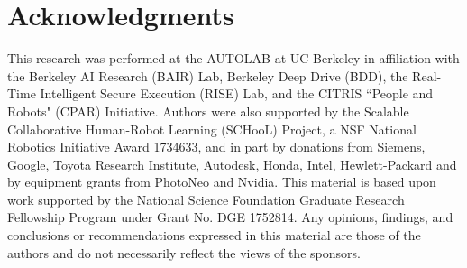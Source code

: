 \section{Acknowledgments}
\begin{scriptsize}
\noindent This research was performed at the AUTOLAB at UC Berkeley in affiliation with the Berkeley AI Research (BAIR) Lab, Berkeley Deep Drive (BDD), the Real-Time Intelligent Secure Execution (RISE) Lab, and the CITRIS ``People and Robots" (CPAR) Initiative. Authors were also supported by the Scalable Collaborative Human-Robot Learning (SCHooL) Project, a NSF National Robotics Initiative Award 1734633, and in part by donations from Siemens, Google, Toyota Research Institute, Autodesk, Honda, Intel, Hewlett-Packard and by equipment grants from PhotoNeo and Nvidia. This material is based upon work supported by the National Science Foundation Graduate Research Fellowship Program under Grant No. DGE 1752814. Any opinions, findings, and conclusions or recommendations expressed in this material are those of the authors and do not necessarily reflect the views of the sponsors.
\end{scriptsize}
